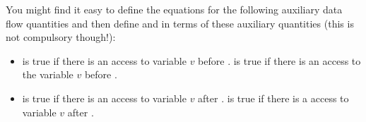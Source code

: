 \documentclass[12pt]{article}
\newcommand{\answer}[1]{{{\blue #1}}}
\renewcommand{\answer}[1]{\mbox{}}
\begin{document}
\begin{enumerate}
\begin{enumerate}
You might find it easy to define the equations for the following
auxiliary data flow quantities and then define  and
 in terms of these auxiliary quantities (this is not
compulsory though!):
\begin{itemize}
\item {} is true if there is an access to variable $v$
  before .   is true if there is an access to
  the variable $v$ before .
\item {} is true if there is an access to variable $v$
  after .  is true if there is a access to
  variable $v$ after .
\end{itemize}
\answer{

\[\begin{array}{r@{\ }c@{\ }l}
  \outdef{v}{S} &=& \left\{\renewcommand{\arraystretch}{1.1}
  \begin{array}{@{}l}
    \mbox{true, if $S$ has an access (def or use) of $v$}\\
    \indef{v}{S},\  \mbox{otherwise}
  \end{array}\right. \\ \\ \\
  \indef{v}{S} &=& \left\{\renewcommand{\arraystretch}{1.1}
  \begin{array}{@{}l}
    \mbox{false, if $S$ is \fgentry\ block}\\
    \bigvee\limits_{P \in \Pred{S}}%
    \outdef{v}{P},\ \mbox{otherwise}
  \end{array}\right. \\ \\ \\
  \inuse{v}{S} &=& \left\{\renewcommand{\arraystretch}{1.1}
  \begin{array}{@{}l}
    \mbox{true, if $S$ has an access (def or use) of $v$}\\
    \outuse{v}{S},\  \mbox{otherwise}
  \end{array}\right. \\ \\ \\
  \outuse{v}{S} &=& \left\{\renewcommand{\arraystretch}{1.1}
  \begin{array}{@{}l}
    \mbox{false, if $S$ is \fgexit\ block}\\
    \bigvee\limits_{BS \in \Succ{S}} %
    \inuse{v}{BS},\ \mbox{otherwise}
  \end{array}\right.
\end{array}\]

}
\end{enumerate}
\end{enumerate}
\end{document}
